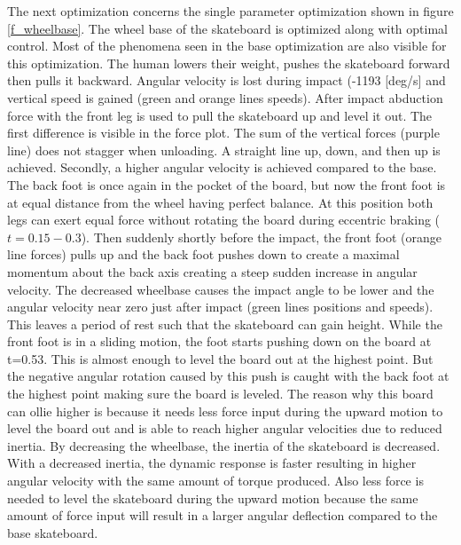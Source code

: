 \documentclass[default,iicol]{sn-jnl}
\begin{document}
{\noindent The next optimization concerns the single parameter optimization shown in figure \ref{f_wheelbase}. The wheel base of the skateboard is optimized along with optimal control. Most of the phenomena seen in the base optimization are also visible for this optimization. The human lowers their weight, pushes the skateboard forward then pulls it backward. Angular velocity is lost during impact (-1193 [deg/s] and vertical speed is gained (green and orange lines speeds). After impact abduction force with the front leg is used to pull the skateboard up and level it out. The first difference is visible in the force plot. The sum of the vertical forces (purple line) does not stagger when unloading. A straight line up, down, and then up is achieved. Secondly, a higher angular velocity is achieved compared to the base. The back foot is once again in the pocket of the board, but now the front foot is at equal distance from the wheel having perfect balance. At this position both legs can exert equal force without rotating the board during eccentric braking ($t=0.15 - 0.3$). Then suddenly shortly before the impact, the front foot (orange line forces) pulls up and the back foot pushes down to create a maximal momentum about the back axis creating a steep sudden increase in angular velocity. The decreased wheelbase causes the impact angle to be lower and the angular velocity near zero just after impact (green lines positions and speeds). This leaves a period of rest such that the skateboard can gain height. While the front foot is in a sliding motion, the foot starts pushing down on the board at t=0.53.  This is almost enough to level the board out at the highest point. But the negative angular rotation caused by this push is caught with the back foot at the highest point making sure the board is leveled. 
The reason why this board can ollie higher is because it needs less force input during the upward motion to level the board out and is able to reach higher angular velocities due to reduced inertia. By decreasing the wheelbase, the inertia of the skateboard is decreased. With a decreased inertia, the dynamic response is faster resulting in higher angular velocity with the same amount of torque produced. Also less force is needed to level the skateboard during the upward motion because the same amount of force input will result in a larger angular deflection compared to the base skateboard. 

}
\end{document}
